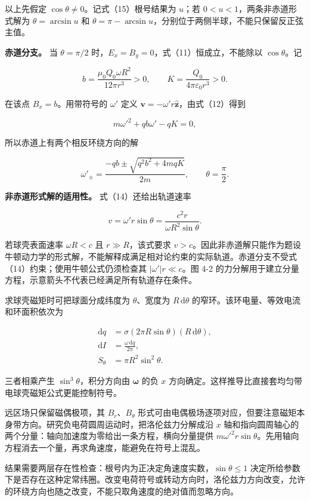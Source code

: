 \documentclass[12pt,a4paper,UTF8]{ctexart}
\begin{document}
以上先假定 \(\cos\theta\ne0\)。记式（15）根号结果为 \(u\)；若
\(0<u<1\)，两条非赤道形式解为 \(\theta=\arcsin u\) 和
\(\theta=\pi-\arcsin u\)，分别位于两侧半球，不能只保留反正弦主值。

\textbf{赤道分支。} 当 \(\theta=\pi/2\)
时，\(E_x=B_y=0\)，式（11）恒成立，不能除以 \(\cos\theta\)。记

\[b=\frac{\mu_0Q_0\omega R^2}{12\pi r^3}>0,\qquad K=\frac{Q_0}{4\pi\varepsilon_0r^3}>0.\]

在该点 \(B_x=b\)。用带符号的 \(\omega'\) 定义
\(\boldsymbol v=-\omega'r\hat{\boldsymbol z}\)，由式（12）得到

\[m\omega'^2+qb\omega'-qK=0,\]

所以赤道上有两个相反环绕方向的解

\[\boxed{\omega'_\pm=\frac{-qb\pm\sqrt{q^2b^2+4mqK}}{2m},\qquad\theta=\frac\pi2}.\]

\textbf{非赤道形式解的适用性。} 式（14）还给出轨道速率

\[v=\omega'r\sin\theta=\frac{c^2r}{\omega R^2\sin\theta}.\]

若球壳表面速率 \(\omega R<c\) 且 \(r\gg R\)，该式要求
\(v>c\)。因此非赤道解只能作为题设牛顿动力学的形式解，不能解释成满足相对论约束的实际轨道。赤道分支不受式（14）约束；使用牛顿公式仍须检查其
\(|\omega'|r\ll c\)。图 4-2
的力分解用于建立分量方程，示意箭头不代表已经满足所有轨道存在条件。

求球壳磁矩时可把球面分成纬度为 \(\theta\)、宽度为 \(R\,\mathrm d\theta\)
的窄环。该环电量、等效电流和环面积依次为

\[\begin{aligned}
\mathrm dq&=\sigma(2\pi R\sin\theta)(R\,\mathrm d\theta),\\
\mathrm dI&=\frac{\omega\,\mathrm dq}{2\pi},\\
S_\theta&=\pi R^2\sin^2\theta.
\end{aligned}\]

三者相乘产生 \(\sin^3\theta\)，积分方向由 \(\boldsymbol\omega\) 的负
\(x\) 方向确定。这样推导比直接套均匀带电球壳磁矩公式更能控制符号。

远区场只保留磁偶极项，其 \(B_r\)、\(B_\theta\)
形式可由电偶极场逐项对应，但要注意磁矩本身带方向。研究负电荷圆周运动时，把洛伦兹力分解成沿
\(x\)
轴和指向圆周轴心的两个分量：轴向加速度为零给出一条方程，横向分量提供
\(m\omega'^2r\sin\theta\)。先用轴向方程消去一个量，再求角速度，能避免在符号上混乱。

结果需要两层存在性检查：根号内为正决定角速度实数，\(\sin\theta\leqslant1\)
决定所给参数下是否存在这种定常纬圈。改变电荷符号或转动方向时，洛伦兹力方向改变，允许的环绕方向也随之改变，不能只取角速度的绝对值而忽略方向。
\end{document}
